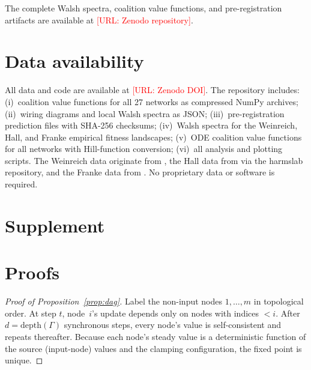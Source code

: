 \documentclass[10pt]{article}
\begin{document}
The complete Walsh spectra, coalition value functions, and
pre-registration artifacts are available at
\textcolor{red}{[URL: Zenodo repository]}.


\section*{Data availability}

All data and code are available at \textcolor{red}{[URL: Zenodo DOI]}.
The repository includes: (i)~coalition value functions for all 27
networks as compressed NumPy archives; (ii)~wiring diagrams and local
Walsh spectra as JSON; (iii)~pre-registration prediction files with
SHA-256 checksums; (iv)~Walsh spectra for the Weinreich, Hall, and Franke
empirical fitness landscapes; (v)~ODE coalition value functions for
all networks with Hill-function conversion; (vi)~all analysis and
plotting scripts.
The Weinreich data originate from \citet{weinreich2006darwinian},
the Hall data from \citet{hall2010fitness} via the harmslab
repository, and the Franke data from \citet{franke2011evolutionary}.
No proprietary data or software is required.







\clearpage
\appendix
\renewcommand{\thesection}{S\arabic{section}}
\setcounter{section}{0}
\section*{Supplement}


\section{Proofs}
\label{supp:proofs}

\begin{proof}[Proof of Proposition~\ref{prop:dag}]
Label the non-input nodes $1, \ldots, m$ in topological order. At
step $t$, node~$i$'s update depends only on nodes with indices
$< i$. After $d = \mathrm{depth}(\Gamma)$ synchronous steps, every
node's value is self-consistent and repeats thereafter. Because
each node's steady value is a deterministic function of the source
(input-node) values and the clamping configuration, the fixed point
is unique.
\end{proof}
\end{document}
